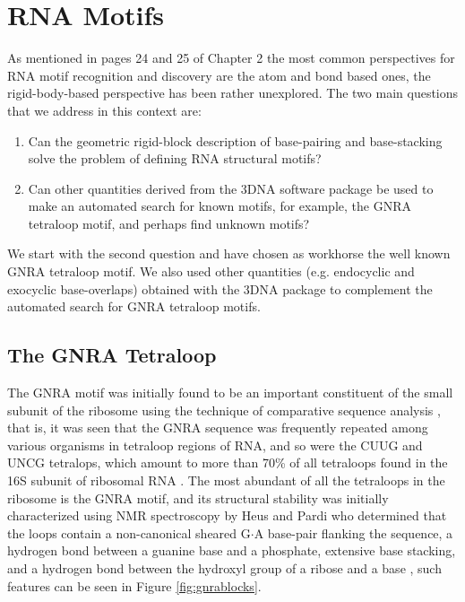 \chapter{RNA Motifs}
\label{motifs} 
 As mentioned  in pages 24 and 25  of Chapter 2
the most  common perspectives for RNA motif  recognition and discovery
are the atom and bond based ones, the rigid-body-based perspective has
been rather  unexplored.  The  two main questions  that we  address in
this context are:

\begin{enumerate}
\item{Can  the geometric rigid-block  description of  base-pairing and
  base-stacking solve the problem of defining RNA structural motifs?}
\item{Can other  quantities derived from the 3DNA  software package be
  used to make an automated search for known motifs, for example, the
  GNRA tetraloop motif, and perhaps find unknown motifs?}
\end{enumerate}

We start with the  second question and have chosen as workhorse
the  well  known  GNRA  tetraloop  motif.  We  also  used  other
quantities  (e.g.  endocyclic  and  exocyclic base-overlaps)  obtained
with the 3DNA \cite{lu2003, lu2008b} package to  complement the
automated search for GNRA tetraloop motifs.

\section{The GNRA Tetraloop}
The GNRA motif  was initially found to be  an important constituent of
the small subunit  of the ribosome using the  technique of comparative
sequence analysis \cite{woese1990}, that is, it was seen that the GNRA
sequence was frequently repeated  among various organisms in tetraloop
regions of RNA, and so were  the CUUG and UNCG tetralops, which amount
to  more than  70\% of  all  tetraloops found  in the  16S subunit  of
ribosomal RNA \cite{woese1990, depaul2010}.   The most abundant of all
the tetraloops in  the ribosome is the GNRA  motif, and its structural
stability was  initially characterized using NMR  spectroscopy by Heus
and  Pardi \cite{heus1991}  who determined  that the  loops  contain a
non-canonical  sheared G$\cdot$A  base-pair flanking  the  sequence, a
hydrogen bond between  a guanine base and a  phosphate, extensive base
stacking, and a  hydrogen bond between the hydroxyl  group of a ribose
and  a base  \cite{heus1991},  such  features can  be  seen in  Figure
\ref{fig:gnrablocks}.

